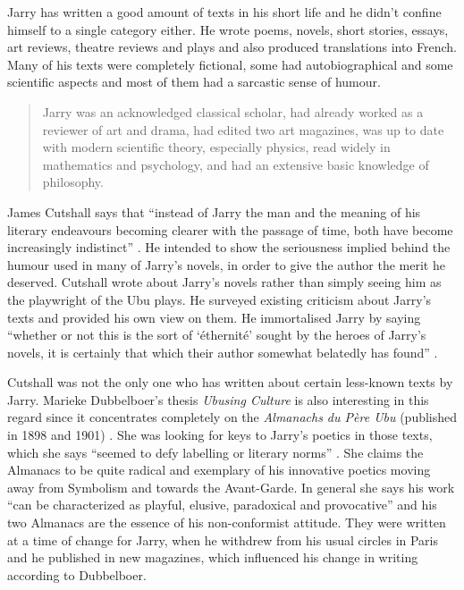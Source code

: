 Jarry has written a good amount of texts in his short life and he didn't confine himself to a single category either. He wrote poems, novels, short stories, essays, art reviews, theatre reviews and plays and also produced translations into French. Many of his texts were completely fictional, some had autobiographical and some scientific aspects and most of them had a sarcastic sense of humour.

\begin{quotation}
  Jarry was an acknowledged classical scholar, had already worked as a reviewer of art and drama, had edited two art magazines, was up to date with modern scientific theory, especially physics, read widely in mathematics and psychology, and had an extensive basic knowledge of philosophy. 
\end{quotation}

James Cutshall says that ``instead of Jarry the man and the meaning of his literary endeavours becoming clearer with the passage of time, both have become increasingly indistinct'' \citeyear[p.246]{Cutshall1988}. He intended to show the seriousness implied behind the humour used in many of Jarry's novels, in order to give the author the merit he deserved. Cutshall wrote about Jarry's novels rather than simply seeing him as the playwright of the Ubu plays. He surveyed existing criticism about Jarry's texts and provided his own view on them. He immortalised Jarry by saying ``whether or not this is the sort of `éthernité' sought by the heroes of Jarry's novels, it is certainly that which their author somewhat belatedly has found'' \autocite[p.248]{Cutshall1988}.


Cutshall was not the only one who has written about certain less-known texts by Jarry. Marieke Dubbelboer's thesis \textit{Ubusing Culture} is also interesting in this regard since it concentrates completely on the \textit{Almanachs du Père Ubu} (published in 1898 and 1901) \citeyear{Dubbelboer2009}. She was looking for keys to Jarry's poetics in those texts, which she says ``seemed to defy labelling or literary norms'' \autocite[p.10]{Dubbelboer2009}. She claims the Almanacs to be quite radical and exemplary of his innovative poetics moving away from Symbolism and towards the Avant-Garde. In general she says his work ``can be characterized as playful, elusive, paradoxical and provocative'' \autocite[p.197]{Dubbelboer2009} and his two Almanacs are the essence of his non-conformist attitude. They were written at a time of change for Jarry, when he withdrew from his usual circles in Paris and he published in new magazines, which influenced his change in writing according to Dubbelboer.

